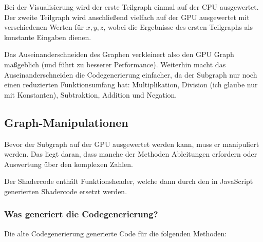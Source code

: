 \documentclass[
	ngerman,%
	accentcolor=9c,%
	ruledheaders=section,%
	class=report,%
	thesis={type=bachelor},%
	fontsize=11pt,%
	parskip=half-,%
	custommargins=true,%
	marginpar=false,%
]{tudapub}
\begin{document}
Bei der Visualisierung wird der erste Teilgraph einmal auf der CPU ausgewertet.  
Der zweite Teilgraph wird anschließend vielfach auf der GPU ausgewertet mit verschiedenen Werten für \(x,y,z\), wobei die 
Ergebnisse des ersten Teilgraphs als konstante Eingaben dienen.

Das Auseinanderschneiden des Graphen verkleinert also den GPU Graph maßgeblich (und führt zu besserer Performance).
Weiterhin macht das Auseinanderschneiden die Codegenerierung einfacher, da der Subgraph nur noch einen reduzierten Funktionsumfang hat:
Multiplikation, Division (ich glaube nur mit Konstanten), Subtraktion, Addition und Negation.
\subsection{Graph-Manipulationen}
Bevor der Subgraph auf der GPU ausgewertet werden kann, muss er manipuliert werden. Das liegt daran, dass manche der Methoden Ableitungen erfordern oder Auswertung über den komplexen Zahlen.

Der Shadercode enthält Funktionsheader, welche dann durch den in JavaScript
generierten Shadercode ersetzt werden.

\subsubsection{Was generiert die Codegenerierung?}
Die alte Codegenerierung generierte Code für die folgenden Methoden:
\end{document}
